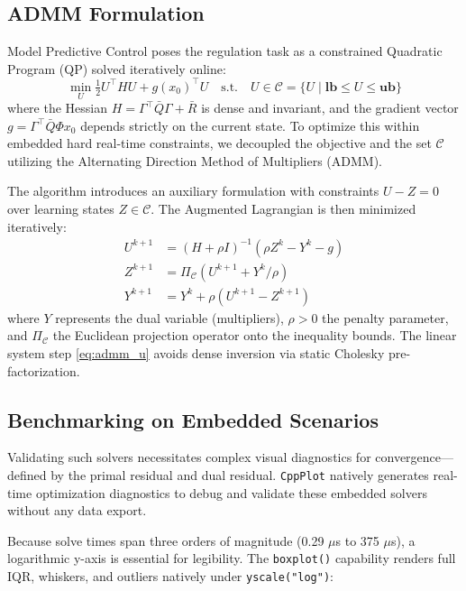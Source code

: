 \documentclass[preprint,12pt]{elsarticle}
\begin{document}
\subsection{ADMM Formulation}
Model Predictive Control poses the regulation task as a constrained Quadratic Program (QP) solved iteratively online:
\begin{equation}
    \min_{U} \tfrac{1}{2} U^\top H U + g(x_0)^\top U \quad \text{s.t.} \quad U \in \mathcal{C} = \{U \mid \mathbf{lb} \le U \le \mathbf{ub}\}
\end{equation}
where the Hessian $H = \Gamma^\top \bar{Q} \Gamma + \bar{R}$ is dense and invariant, and the gradient vector $g = \Gamma^\top \bar{Q}\Phi x_0$ depends strictly on the current state. To optimize this within embedded hard real-time constraints, we decoupled the objective and the set $\mathcal{C}$ utilizing the Alternating Direction Method of Multipliers (ADMM). 

The algorithm introduces an auxiliary formulation with constraints $U - Z = 0$ over learning states $Z \in \mathcal{C}$. The Augmented Lagrangian is then minimized iteratively:
\begin{align}
    U^{k+1} &= (H + \rho I)^{-1}(\rho Z^k - Y^k - g) \label{eq:admm_u}\\
    Z^{k+1} &= \Pi_{\mathcal{C}}\left( U^{k+1} + Y^k/\rho \right) \label{eq:admm_z}\\
    Y^{k+1} &= Y^k + \rho(U^{k+1} - Z^{k+1}) \label{eq:admm_y}
\end{align}
where $Y$ represents the dual variable (multipliers), $\rho > 0$ the penalty parameter, and $\Pi_{\mathcal{C}}$ the Euclidean projection operator onto the inequality bounds. The linear system step \eqref{eq:admm_u} avoids dense inversion via static Cholesky pre-factorization.

\subsection{Benchmarking on Embedded Scenarios}
Validating such solvers necessitates complex visual diagnostics for convergence—defined by the primal residual and dual residual. \texttt{CppPlot} natively generates real-time optimization diagnostics to debug and validate these embedded solvers without any data export. 

Because solve times span three orders of magnitude (0.29 $\mu$s to 375 $\mu$s), a logarithmic y-axis is essential for legibility. The \texttt{boxplot()} capability renders full IQR, whiskers, and outliers natively under \texttt{yscale("log")}:
\end{document}
